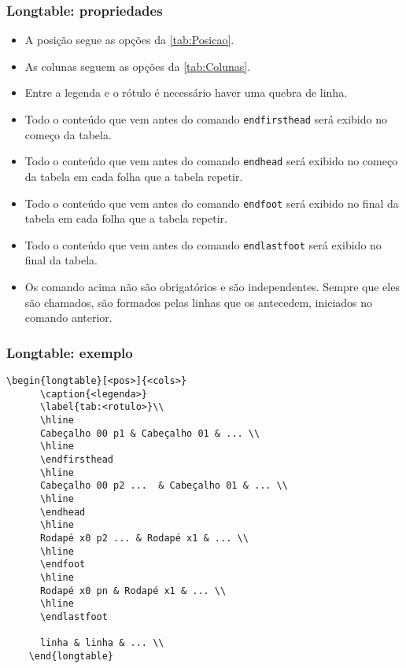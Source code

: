\documentclass[brazilian]{beamer}
\begin{document}
\begin{frame}[fragile]
  \frametitle{Longtable: propriedades}

  \begin{itemize}
    \item A posição segue as opções da \cref{tab:Posicao}.
    \item As colunas seguem as opções da \cref{tab:Colunas}.
    \item Entre a legenda e o rótulo é necessário haver uma quebra de linha.
    \item Todo o conteúdo que vem antes do comando \lstinline[style=myStyleLatex]!endfirsthead! será exibido no começo da tabela.
    \item Todo o conteúdo que vem antes do comando \lstinline[style=myStyleLatex]!endhead! será exibido no começo da tabela em cada folha que a tabela repetir.
    \item Todo o conteúdo que vem antes do comando \lstinline[style=myStyleLatex]!endfoot! será exibido no final da tabela em cada folha que a tabela repetir.
    \item Todo o conteúdo que vem antes do comando \lstinline[style=myStyleLatex]!endlastfoot! será exibido no final da tabela.
    \item Os comando acima não são obrigatórios e são independentes. Sempre que eles são chamados, são formados pelas linhas que os antecedem, iniciados no comando anterior.
  \end{itemize}

\end{frame}

\begin{frame}[fragile]
  \frametitle{Longtable: exemplo}
  \tiny
  \begin{lstlisting}[style=myStyleLatex]
    \begin{longtable}[<pos>]{<cols>}
      \caption{<legenda>}
      \label{tab:<rotulo>}\\
      \hline
      Cabeçalho 00 p1 & Cabeçalho 01 & ... \\ 
      \hline
      \endfirsthead
      \hline
      Cabeçalho 00 p2 ...  & Cabeçalho 01 & ... \\ 
      \hline 
      \endhead
      \hline
      Rodapé x0 p2 ... & Rodapé x1 & ... \\ 
      \hline
      \endfoot
      \hline
      Rodapé x0 pn & Rodapé x1 & ... \\ 
      \hline
      \endlastfoot
      
      linha & linha & ... \\
    \end{longtable} 
  \end{lstlisting}

\end{frame}
\end{document}
